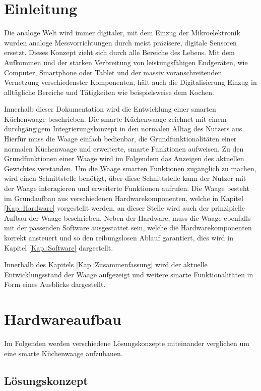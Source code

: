 \section{Einleitung\label{Kap.:Einleitung}}

Die analoge Welt wird immer digitaler, mit dem Einzug der Mikroelektronik wurden analoge Messvorrichtungen durch meist präzisere, digitale Sensoren ersetzt. Dieses Konzept zieht sich durch alle Bereiche des Lebens. Mit dem Aufkommen und der starken Verbreitung von leistungsfähigen Endgeräten, wie Computer, Smartphone oder Tablet und der massiv voranschreitenden Vernetzung verschiedenster Komponenten, hält auch die Digitalisierung Einzug in alltägliche Bereiche und Tätigkeiten wie beispielsweise dem Kochen.

Innerhalb dieser Dokumentation wird die Entwicklung einer smarten Küchenwaage beschrieben. Die smarte Küchenwaage zeichnet mit einem durchgängigem Integrierungskonzept in den normalen Alltag des Nutzers aus. Hierfür muss die Waage einfach bedienbar, die Grundfunktionalitäten einer normalen Küchenwaage und erweiterte, smarte Funktionen aufweisen. Zu den Grundfunktionen einer Waage wird im Folgendem das Anzeigen des aktuellen Gewichtes verstanden. Um die Waage smarten Funktionen zugänglich zu machen, wird einen Schnittstelle benötigt, über diese Schnittstelle kann der Nutzer mit der Waage interagieren und erweiterte Funktionen aufrufen. Die Waage besteht im Grundaufbau aus verschiedenen Hardwarekomponenten, welche in Kapitel \ref{Kap.:Hardware} vorgestellt werden, an dieser Stelle wird auch der prinzipielle Aufbau der Waage beschrieben. Neben der Hardware, muss die Waage ebenfalls mit der passenden Software ausgestattet sein, welche die Hardwarekomponenten korrekt ansteuert und so den reibungslosen Ablauf garantiert, dies wird in Kapitel \ref{Kap.:Software} dargestellt. 

Innerhalb des Kapitels \ref{Kap.:Zusammenfassung} wird der aktuelle Entwicklungsstand der Waage aufgezeigt und weitere smarte Funktionalitäten in Form eines Ausblicks dargestellt. 

\section{Hardwareaufbau\label{Kap.:Hardware}}
Im Folgenden werden verschiedene Lösungskonzepte miteinander verglichen um eine smarte Küchenwaage aufzubauen.%

\subsection{Lösungskonzept}

